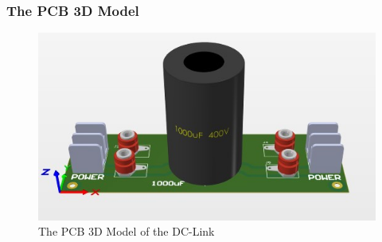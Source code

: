 \documentclass[12pt,a4paper]{book}
\begin{document}
\subsubsection{The PCB 3D Model}
\begin{figure}[h!]
  \centering
  \includegraphics[width = 15cm]{image45.png}
  \caption{The PCB 3D Model of the DC-Link}
  \label{fig:image45}
\end{figure}



\end{document}
